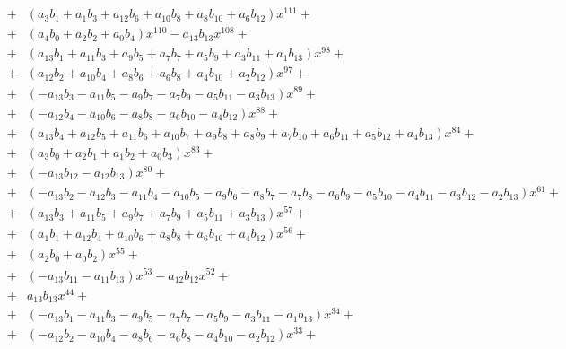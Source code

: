 \documentclass{article}
\begin{document}
\begin{eqnarray*}
&+&   \left(a_{3} b_{1} + a_{1} b_{3} + a_{12} b_{6} + a_{10} b_{8} + a_{8} b_{10} + a_{6} b_{12}\right) x^{111}  + \\
&+&   \left(a_{4} b_{0} + a_{2} b_{2} + a_{0} b_{4}\right) x^{110} -  a_{13} b_{13} x^{108}  + \\
&+&   \left(a_{13} b_{1} + a_{11} b_{3} + a_{9} b_{5} + a_{7} b_{7} + a_{5} b_{9} + a_{3} b_{11} + a_{1} b_{13}\right) x^{98}  + \\
&+&   \left(a_{12} b_{2} + a_{10} b_{4} + a_{8} b_{6} + a_{6} b_{8} + a_{4} b_{10} + a_{2} b_{12}\right) x^{97}  + \\
&+&   \left(- a_{13} b_{3} -  a_{11} b_{5} -  a_{9} b_{7} -  a_{7} b_{9} -  a_{5} b_{11} -  a_{3} b_{13}\right) x^{89}  + \\
&+&   \left(- a_{12} b_{4} -  a_{10} b_{6} -  a_{8} b_{8} -  a_{6} b_{10} -  a_{4} b_{12}\right) x^{88}  + \\
&+&   \left(a_{13} b_{4} + a_{12} b_{5} + a_{11} b_{6} + a_{10} b_{7} + a_{9} b_{8} + a_{8} b_{9} + a_{7} b_{10} + a_{6} b_{11} + a_{5} b_{12} + a_{4} b_{13}\right) x^{84}  + \\
&+&   \left(a_{3} b_{0} + a_{2} b_{1} + a_{1} b_{2} + a_{0} b_{3}\right) x^{83}  + \\
&+&   \left(- a_{13} b_{12} -  a_{12} b_{13}\right) x^{80}  + \\
&+&   \left(- a_{13} b_{2} -  a_{12} b_{3} -  a_{11} b_{4} -  a_{10} b_{5} -  a_{9} b_{6} -  a_{8} b_{7} -  a_{7} b_{8} -  a_{6} b_{9} -  a_{5} b_{10} -  a_{4} b_{11} -  a_{3} b_{12} -  a_{2} b_{13}\right) x^{61}  + \\
&+&   \left(a_{13} b_{3} + a_{11} b_{5} + a_{9} b_{7} + a_{7} b_{9} + a_{5} b_{11} + a_{3} b_{13}\right) x^{57}  + \\
&+&   \left(a_{1} b_{1} + a_{12} b_{4} + a_{10} b_{6} + a_{8} b_{8} + a_{6} b_{10} + a_{4} b_{12}\right) x^{56}  + \\
&+&   \left(a_{2} b_{0} + a_{0} b_{2}\right) x^{55}  + \\
&+&   \left(- a_{13} b_{11} -  a_{11} b_{13}\right) x^{53} -  a_{12} b_{12} x^{52}  + \\
&+&   a_{13} b_{13} x^{44}  + \\
&+&   \left(- a_{13} b_{1} -  a_{11} b_{3} -  a_{9} b_{5} -  a_{7} b_{7} -  a_{5} b_{9} -  a_{3} b_{11} -  a_{1} b_{13}\right) x^{34}  + \\
&+&   \left(- a_{12} b_{2} -  a_{10} b_{4} -  a_{8} b_{6} -  a_{6} b_{8} -  a_{4} b_{10} -  a_{2} b_{12}\right) x^{33}  + \\

\end{eqnarray*}
\end{document}
